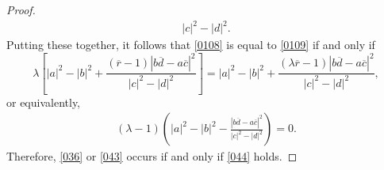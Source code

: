 \documentclass[11pt]{amsart}%
\theoremstyle{definition}
\newtheorem{rem}[thm]{Remark}
\theoremstyle{remark}
\numberwithin{equation}{section}
\begin{document}
\begin{proof}
\begin{align}
{}{|c|^{2}-|d|^{2}}.
\end{align}
Putting these together, it follows that \eqref{0108} is equal to \eqref{0109} if and only if
\[
\lambda\left[  |a|^{2}-|b|^{2}+\frac{(\overline{r}-1)|b\overline{d}%
-a\overline{c}|^{2}}{|c|^{2}-|d|^{2}}\right]  =|a|^{2}-|b|^{2}+\frac
{(\lambda\overline{r}-1)|b\overline{d}-a\overline{c}|^{2}}{|c|^{2}-|d|^{2}},
\]
or equivalently,
\begin{align}\label{044}
(\lambda-1)\left(  |a|^{2}-|b|^{2}-\frac{|b\overline{d}-a\overline{c}|^{2}%
}{|c|^{2}-|d|^{2}}\right)  =0.
\end{align}
Therefore, \eqref{036} or \eqref{043} occurs if and only if \eqref{044} holds.
\end{proof}

\end{document}
